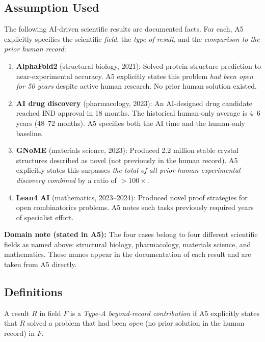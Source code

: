 

\subsection*{Assumption Used}

\begin{assumption}\label{A5}
  The following AI-driven scientific results are documented facts.
  For each, A5 explicitly specifies the scientific \emph{field},
  the \emph{type of result}, and the \emph{comparison to the prior
  human record}:
  \begin{enumerate}
    \item \textbf{AlphaFold2} (structural biology, 2021):
      Solved protein-structure prediction to near-experimental accuracy.
      A5 explicitly states this problem \emph{had been open for 50 years}
      despite active human research.  No prior human solution existed.
    \item \textbf{AI drug discovery} (pharmacology, 2023):
      An AI-designed drug candidate reached IND approval in 18 months.
      The historical human-only average is 4--6 years (48--72 months).
      A5 specifies both the AI time and the human-only baseline.
    \item \textbf{GNoME} (materials science, 2023):
      Produced 2.2 million stable crystal structures described as novel
      (not previously in the human record).
      A5 explicitly states this surpasses \emph{the total of all prior
      human experimental discovery combined} by a ratio of $>100\times$.
    \item \textbf{Lean4 AI} (mathematics, 2023--2024):
      Produced novel proof strategies for open combinatorics problems.
      A5 notes such tasks previously required years of specialist effort.
  \end{enumerate}
  \textbf{Domain note (stated in A5):} The four cases belong to four
  different scientific fields as named above: structural biology,
  pharmacology, materials science, and mathematics.  These names appear
  in the documentation of each result and are taken from A5 directly.
\end{assumption}

\subsection*{Definitions}

\begin{definition}\label{defA}
  A result $R$ in field $F$ is a \emph{Type-A beyond-record contribution}
  if A5 explicitly states that $R$ solved a problem that had been
  \emph{open} (no prior solution in the human record) in $F$.
\end{definition}

